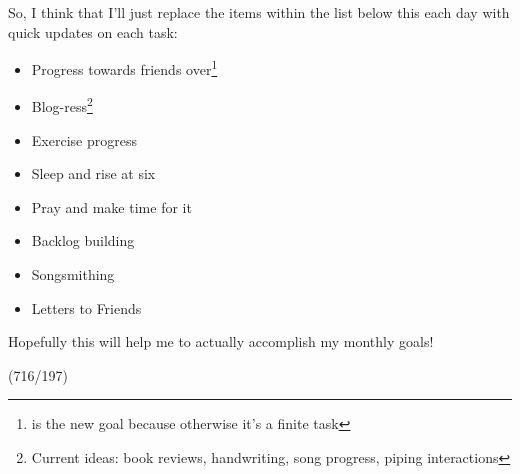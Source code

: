 \documentclass[12pt]{article}[titlepage]
\renewcommand{\,}{\textsuperscript{,}}
\begin{document}
So, I think that I'll just replace the items within the list below this each day with quick updates on each task:

\begin{itemize}
\item Progress towards friends over\footnote{is the new goal because otherwise it's a finite task}
\item Blog-ress\footnote{Current ideas: book reviews, handwriting, song progress, piping interactions}
\item Exercise progress
\item Sleep and rise at six
\item Pray and make time for it
\item Backlog building
\item Songsmithing
\item Letters to Friends
\end{itemize}

Hopefully this will help me to actually accomplish my monthly goals!

(716/197)
\end{document}
